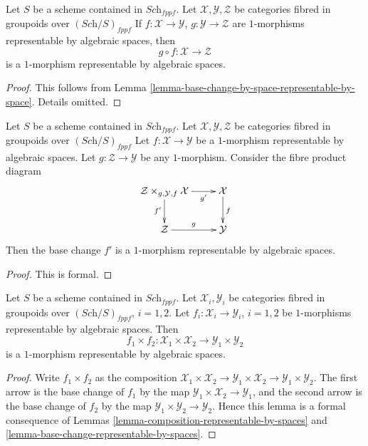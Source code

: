 \begin{lemma}
\label{lemma-composition-representable-by-spaces}
Let $S$ be a scheme contained in $\textit{Sch}_{fppf}$.
Let $\mathcal{X}, \mathcal{Y}, \mathcal{Z}$
be categories fibred in groupoids over $(\textit{Sch}/S)_{fppf}$
If $f : \mathcal{X} \to \mathcal{Y}$, $g : \mathcal{Y} \to \mathcal{Z}$
are $1$-morphisms representable by algebraic spaces, then
$$
g \circ f : \mathcal{X} \longrightarrow \mathcal{Z}
$$
is a $1$-morphism representable by algebraic spaces.
\end{lemma}

\begin{proof}
This follows from
Lemma \ref{lemma-base-change-by-space-representable-by-space}.
Details omitted.
\end{proof}

\begin{lemma}
\label{lemma-base-change-representable-by-spaces}
Let $S$ be a scheme contained in $\textit{Sch}_{fppf}$.
Let $\mathcal{X}, \mathcal{Y}, \mathcal{Z}$
be categories fibred in groupoids over $(\textit{Sch}/S)_{fppf}$
Let $f : \mathcal{X} \to \mathcal{Y}$ be a $1$-morphism
representable by algebraic spaces.
Let $g : \mathcal{Z} \to \mathcal{Y}$ be any $1$-morphism.
Consider the fibre product diagram
$$
\xymatrix{
\mathcal{Z} \times_{g, \mathcal{Y}, f} \mathcal{X} \ar[r]_-{g'} \ar[d]_{f'} &
\mathcal{X} \ar[d]^f \\
\mathcal{Z} \ar[r]^g & \mathcal{Y}
}
$$
Then the base change $f'$ is a $1$-morphism representable by
algebraic spaces.
\end{lemma}

\begin{proof}
This is formal.
\end{proof}

\begin{lemma}
\label{lemma-product-representable-by-spaces}
Let $S$ be a scheme contained in $\textit{Sch}_{fppf}$.
Let $\mathcal{X}_i, \mathcal{Y}_i$ be categories fibred in groupoids over
$(\textit{Sch}/S)_{fppf}$, $i = 1, 2$.
Let $f_i : \mathcal{X}_i \to \mathcal{Y}_i$, $i = 1, 2$
be $1$-morphisms representable by algebraic spaces.
Then
$$
f_1 \times f_2 :
\mathcal{X}_1 \times \mathcal{X}_2
\longrightarrow
\mathcal{Y}_1 \times \mathcal{Y}_2
$$
is a $1$-morphism representable by algebraic spaces.
\end{lemma}

\begin{proof}
Write $f_1 \times f_2$ as the composition
$\mathcal{X}_1 \times \mathcal{X}_2 \to
\mathcal{Y}_1 \times \mathcal{X}_2 \to
\mathcal{Y}_1 \times \mathcal{Y}_2$.
The first arrow is the base change of $f_1$ by the map
$\mathcal{Y}_1 \times \mathcal{X}_2 \to \mathcal{Y}_1$, and the second arrow
is the base change of $f_2$ by the map
$\mathcal{Y}_1 \times \mathcal{Y}_2 \to \mathcal{Y}_2$.
Hence this lemma is a formal
consequence of Lemmas \ref{lemma-composition-representable-by-spaces}
and \ref{lemma-base-change-representable-by-spaces}.
\end{proof}












